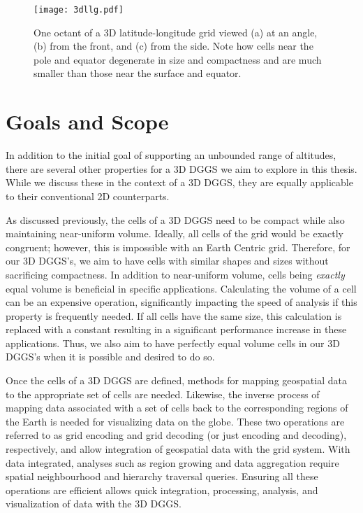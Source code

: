 \begin{figure}[htb!]
	\centering
	\texttt{[image: 3dllg.pdf]}
	\caption[Different views of a 3D latitude-longitude grid]{
		One octant of a 3D latitude-longitude grid viewed (a) at an angle, (b) from the front, and (c) from the side.
		Note how cells near the pole and equator degenerate in size and compactness and are much smaller than those near the surface and equator.
	}
	\label{fig:3dllg}
\end{figure}


\section{Goals and Scope} \label{chap:1:goals}
In addition to the initial goal of supporting an unbounded range of altitudes, there are several other properties for a 3D DGGS we aim to explore in this thesis.
While we discuss these in the context of a 3D DGGS, they are equally applicable to their conventional 2D counterparts.


As discussed previously, the cells of a 3D DGGS need to be compact while also maintaining near-uniform volume.
Ideally, all cells of the grid would be exactly congruent; however, this is impossible with an Earth Centric grid.
Therefore, for our 3D DGGS's, we aim to have cells with similar shapes and sizes without sacrificing compactness.
In addition to near-uniform volume, cells being \textit{exactly} equal volume is beneficial in specific applications.
Calculating the volume of a cell can be an expensive operation, significantly impacting the speed of analysis if this property is frequently needed.
If all cells have the same size, this calculation is replaced with a constant resulting in a significant performance increase in these applications.
Thus, we also aim to have perfectly equal volume cells in our 3D DGGS's when it is possible and desired to do so.


Once the cells of a 3D DGGS are defined, methods for mapping geospatial data to the appropriate set of cells are needed.
Likewise, the inverse process of mapping data associated with a set of cells back to the corresponding regions of the Earth is needed for visualizing data on the globe.
These two operations are referred to as grid encoding and grid decoding (or just encoding and decoding), respectively, and allow integration of geospatial data with the grid system.
With data integrated, analyses such as region growing and data aggregation require spatial neighbourhood and hierarchy traversal queries.
Ensuring all these operations are efficient allows quick integration, processing, analysis, and visualization of data with the 3D DGGS.


